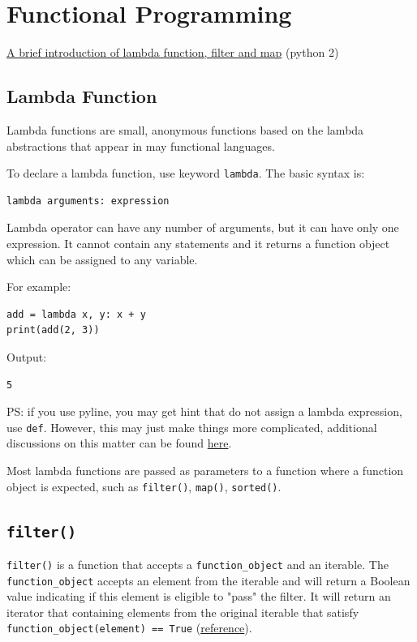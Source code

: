 \documentclass[12pt]{book}
\begin{document}
\chapter{Functional Programming}
\label{sec:org3c469b7}
\href{https://medium.com/@happymishra66/lambda-map-and-filter-in-python-4935f248593}{A brief introduction of lambda function, filter and map} (python 2)

\section{Lambda Function}
\label{sec:orge8efc2b}
Lambda functions are small, anonymous functions based on the lambda abstractions that appear in may functional languages.

To declare a lambda function, use keyword \texttt{lambda}. The basic syntax is:
\begin{verbatim}
lambda arguments: expression
\end{verbatim}
Lambda operator can have any number of arguments, but it can have only one expression. It cannot contain any statements and it returns a function object which can be assigned to any variable.

For example:
\begin{verbatim}
add = lambda x, y: x + y
print(add(2, 3))
\end{verbatim}
Output:
\begin{verbatim}
5
\end{verbatim}
PS: if you use pyline, you may get hint that do not assign a lambda expression, use \texttt{def}. However, this may just make things more complicated, additional discussions on this matter can be found \href{https://stackoverflow.com/questions/25010167/e731-do-not-assign-a-lambda-expression-use-a-def}{here}.

Most lambda functions are passed as parameters to a function where a function object is expected, such as \texttt{filter()}, \texttt{map()}, \texttt{sorted()}.
\section{\texttt{filter()}}
\label{sec:org09857f2}
\texttt{filter()} is a function that accepts a \texttt{function\_object} and an iterable. The \texttt{function\_object} accepts an element from the iterable and will return a Boolean value indicating if this element is eligible to "pass" the filter. It will return an iterator that containing elements from the original iterable that satisfy \texttt{function\_object(element) == True} (\href{https://stackoverflow.com/questions/12319025/filters-in-python3}{reference}).
\end{document}
